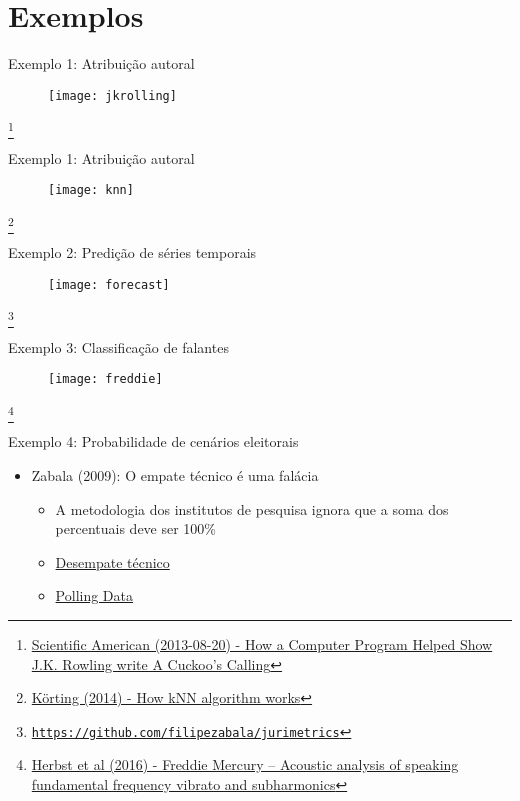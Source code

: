 \documentclass{beamer}
\newcommand\blfootnote[1]{%
  \begingroup
  \renewcommand\thefootnote{}\footnote{#1}%
  \addtocounter{footnote}{-1}%
  \endgroup
}
\begin{document}
\section{Exemplos}
\begin{frame}{Exemplo 1: Atribuição autoral}
\begin{figure}
\texttt{[image: jkrolling]}
\end{figure}
\blfootnote{\tiny{\href{https://www.scientificamerican.com/article/how-a-computer-program-helped-show-jk-rowling-write-a-cuckoos-calling/}{Scientific American (2013-08-20) - How a Computer Program Helped Show J.K. Rowling write A Cuckoo’s Calling}}}
\end{frame}

\begin{frame}{Exemplo 1: Atribuição autoral}
\begin{figure}
\texttt{[image: knn]}
\end{figure}
\blfootnote{\tiny{\href{https://www.youtube.com/watch?v=UqYde-LULfs}{Körting (2014) - How kNN algorithm works}}}
\end{frame}

\begin{frame}{Exemplo 2: Predição de séries temporais}
\begin{figure}
\texttt{[image: forecast]}
\end{figure}
\blfootnote{\tiny{\href{https://github.com/filipezabala/jurimetrics}{\nolinkurl{https://github.com/filipezabala/jurimetrics}}}}
\end{frame}

\begin{frame}{Exemplo 3: Classificação de falantes}
\begin{figure}
\texttt{[image: freddie]}
\end{figure}
\blfootnote{\tiny{\href{https://www.tandfonline.com/doi/abs/10.3109/14015439.2016.1156737}{Herbst et al (2016) - Freddie Mercury – Acoustic analysis of speaking fundamental frequency vibrato and subharmonics}}}
\end{frame}

\begin{frame}{Exemplo 4: Probabilidade de cenários eleitorais}
\begin{itemize}
\item Zabala (2009): O empate técnico é uma falácia
  \begin{itemize}
  \pause
  \item A metodologia dos institutos de pesquisa ignora que a soma dos percentuais deve ser 100\%
  \pause
  \item \href{http://www.filipezabala.com/cursos/dt.html}{Desempate técnico}
  \pause
  \item \href{http://www.pollingdata.com.br/}{Polling Data}
  \end{itemize}
\end{itemize}
\end{frame}
\end{document}
